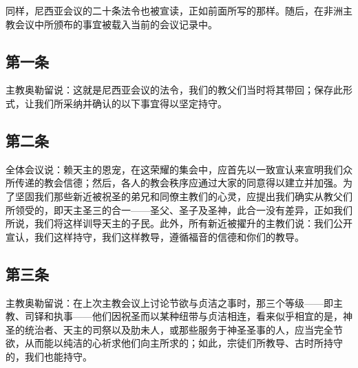 同样，尼西亚会议的二十条法令也被宣读，正如前面所写的那样。随后，在非洲主教会议中所颁布的事宜被载入当前的会议记录中。\par


\subsection{第一条}

\par

主教奥勒留说：这就是尼西亚会议的法令，我们的教父们当时将其带回；保存此形式，让我们所采纳并确认的以下事宜得以坚定持守。\par


\subsection{第二条}

\par

全体会议说：赖天主的恩宠，在这荣耀的集会中，应首先以一致宣认来宣明我们众所传递的教会信德；然后，各人的教会秩序应通过大家的同意得以建立并加强。为了坚固我们那些新近被祝圣的弟兄和同僚主教们的心灵，应提出我们确实从教父们所领受的，即天主圣三的合一——圣父、圣子及圣神，此合一没有差异，正如我们所说，我们将这样训导天主的子民。此外，所有新近被擢升的主教们说：我们公开宣认，我们这样持守，我们这样教导，遵循福音的信德和你们的教导。\par


\subsection{第三条}

\par

主教奥勒留说：在上次主教会议上讨论节欲与贞洁之事时，那三个等级——即主教、司铎和执事——他们因祝圣而以某种纽带与贞洁相连，看来似乎相宜的是，神圣的统治者、天主的司祭以及肋未人，或那些服务于神圣圣事的人，应当完全节欲，从而能以纯洁的心祈求他们向主所求的；如此，宗徒们所教导、古时所持守的，我们也能持守。\par

